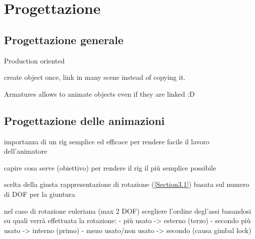 
\chapter{Progettazione} %

\label{Chapter4} %


\section{Progettazione generale}

Production oriented

create object once, link in many scene instead of copying it.

Armatures allows to animate objects even if they are linked :D

\section{Progettazione delle animazioni}

importanza di un rig semplice ed efficace per rendere facile il lavoro dell'animatore

capire cosa serve (obiettivo) per rendere il rig il più semplice possibile

scelta della giusta rappresentazione di rotazione (\ref{Section3.1}) basata sul numero di DOF per la giuntura

nel caso di rotazione euleriana (max 2 DOF) scegliere l'ordine degl'assi basandosi su quali verrà effettuata la rotazione:
- più usato -> esterno (terzo)
- secondo più usato -> interno (primo)
- meno usato/non usato -> secondo (causa gimbal lock)